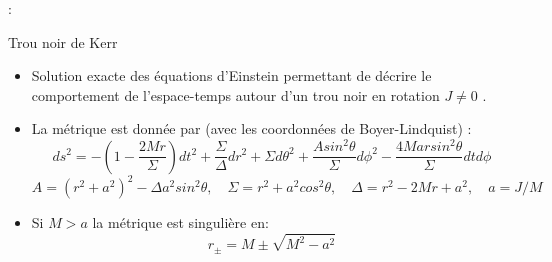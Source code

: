 \begin{frame}{\underline{\secname} : {\small \subsecname}}
\begin{block}{Trou noir de Kerr}
	
	
	\begin{itemize}
		\item Solution exacte des équations d'Einstein permettant de décrire le comportement de l'espace-temps
		autour d'un trou noir en rotation $J\neq 0$ .
		
		\item La métrique est donnée par (avec les coordonnées de Boyer-Lindquist) :
		$$ds^{2}=-(1-\dfrac{2Mr}{\Sigma})dt^{2}+\dfrac{\Sigma}{\Delta}dr^{2}+\Sigma d\theta^{2}+\dfrac{Asin^{2}\theta}{\Sigma} d\phi^{2}-\dfrac{4Marsin^{2}\theta }{\Sigma} dt d\phi$$
		$$A=(r^{2}+a^{2})^{2}-\Delta a^{2}sin^{2}\theta ,\quad
		\Sigma =r^{2}+a^{2}cos^{2}\theta ,\quad
	     \Delta=r^{2}-2Mr+a^{2}  ,\quad
	     a=J / M
	     $$
		\item Si $M > a$  la métrique est singulière en:
		$$r_{\pm} = M \pm\sqrt{M^{2}-a^{2}}$$
		
	\end{itemize}
	
\end{block}
\end{frame}


%	
%
%		
%
%
%

